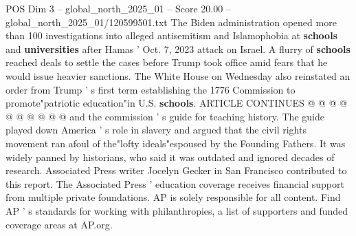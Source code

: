 \begin{textsample}{POS Dim 3 – global\_north\_2025\_01 – Score 20.00 – global\_north\_2025\_01/120599501.txt}
The Biden administration opened more than 100 investigations into alleged antisemitism and Islamophobia at \textbf{schools} and \textbf{universities} after Hamas ' Oct. 7, 2023 attack on Israel.
A flurry of \textbf{schools} reached deals to settle the cases before Trump took office amid fears that he would issue heavier sanctions.
The White House on Wednesday also reinstated an order from Trump ' s first term establishing the 1776 Commission to promote"patriotic education"in U.S. \textbf{schools}.
ARTICLE CONTINUES @ @ @ @ @ @ @ @ @ @ and the commission ' s guide for teaching history.
The guide played down America ' s role in slavery and argued that the civil rights movement ran afoul of the"lofty ideals"espoused by the Founding Fathers.
It was widely panned by historians, who said it was outdated and ignored decades of research.
Associated Press writer Jocelyn Gecker in San Francisco contributed to this report.
The Associated Press ' education coverage receives financial support from multiple private foundations.
AP is solely responsible for all content.
Find AP ' s standards for working with philanthropies, a list of supporters and funded coverage areas at AP.org.

\end{textsample}
